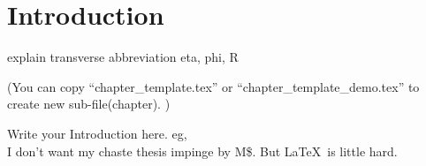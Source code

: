 \documentclass[class=NTHU_thesis, crop=false]{standalone}
\begin{document}
\chapter{Introduction}
explain transverse
abbreviation
eta, phi, R

(You can copy ``chapter\_template.tex'' or ``chapter\_template\_demo.tex'' to create new sub-file(chapter). )

Write your Introduction here.
eg, \\
I don't want my chaste thesis impinge by M\${}. But \LaTeX\ is little hard.
\end{document}
